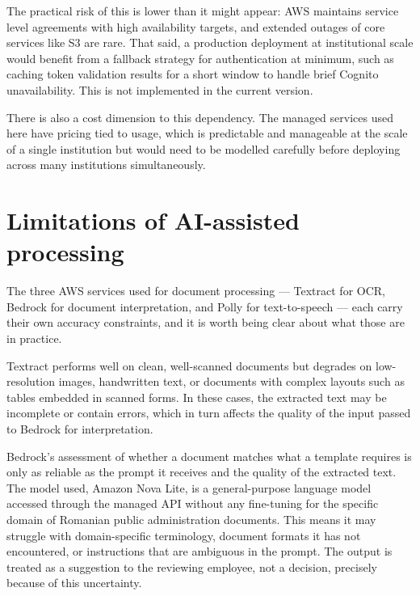 \par The practical risk of this is lower than it might appear: AWS maintains service level agreements with high availability targets, and extended outages of core services like S3 are rare. That said, a production deployment at institutional scale would benefit from a fallback strategy for authentication at minimum, such as caching token validation results for a short window to handle brief Cognito unavailability. This is not implemented in the current version.

\par There is also a cost dimension to this dependency. The managed services used here have pricing tied to usage, which is predictable and manageable at the scale of a single institution but would need to be modelled carefully before deploying across many institutions simultaneously.

\section{Limitations of AI-assisted processing}

\par The three AWS services used for document processing — Textract for OCR, Bedrock for document interpretation, and Polly for text-to-speech — each carry their own accuracy constraints, and it is worth being clear about what those are in practice.

\par Textract performs well on clean, well-scanned documents but degrades on low-resolution images, handwritten text, or documents with complex layouts such as tables embedded in scanned forms. In these cases, the extracted text may be incomplete or contain errors, which in turn affects the quality of the input passed to Bedrock for interpretation.

\par Bedrock's assessment of whether a document matches what a template requires is only as reliable as the prompt it receives and the quality of the extracted text. The model used, Amazon Nova Lite, is a general-purpose language model accessed through the managed API without any fine-tuning for the specific domain of Romanian public administration documents. This means it may struggle with domain-specific terminology, document formats it has not encountered, or instructions that are ambiguous in the prompt. The output is treated as a suggestion to the reviewing employee, not a decision, precisely because of this uncertainty.

